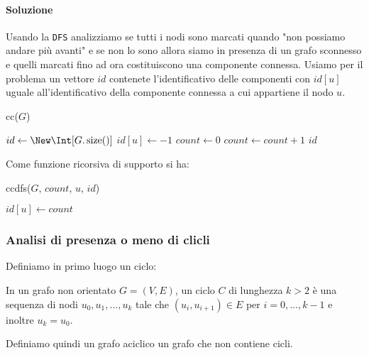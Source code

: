             \paragraph{Soluzione} Usando la \texttt{DFS} analizziamo se tutti i nodi sono marcati quando "non possiamo andare più avanti" e se non lo sono allora siamo in presenza di un grafo sconnesso e quelli marcati fino ad ora costituiscono una componente connessa. Usiamo per il problema un vettore $id$ contenete l'identificativo delle componenti con $id[u]$ uguale all'identificativo della componente connessa a cui appartiene il nodo $u$.
            
            \begin{algorithm}
                \caption{\Int[] cc(\Graph $G$)}
                \begin{algorithmic}
                    \State \Int[] $ id \gets \New \Int[G.\operatorname{size}()] $
                        \State $ id[u] \gets -1 $
                    \EndFor
                    \State \Int $ count \gets 0 $
                            \State $ count \gets count + 1 $
                            \State {}
                        \EndIf
                    \EndFor
                    \State \Return $ id $
                \end{algorithmic}
            \end{algorithm}

            Come funzione ricorsiva di supporto si ha:
            
            \begin{algorithm}
                \caption{ccdfs(\Graph $G$, \Int $count$, \Node $u$, \Int[] $id$)}
                \begin{algorithmic}
                    \State $ id[u] \gets count $
                            \State {}
                        \EndIf
                    \EndFor
                \end{algorithmic}
            \end{algorithm}
        \subsubsection{Analisi di presenza o meno di clicli}
            Definiamo in primo luogo un ciclo:
            \begin{definition}
                In un grafo non orientato $G=(V,E)$, un ciclo $C$ di lunghezza $k>2$ è una sequenza di nodi $u_0,u_1,\dots,u_k$ tale che $(u_i,u_{i+1})\in E$ per $i=0,\dots,k-1$ e inoltre $u_k = u_0$.
            \end{definition}
            Definiamo quindi un grafo aciclico un grafo che non contiene cicli.
